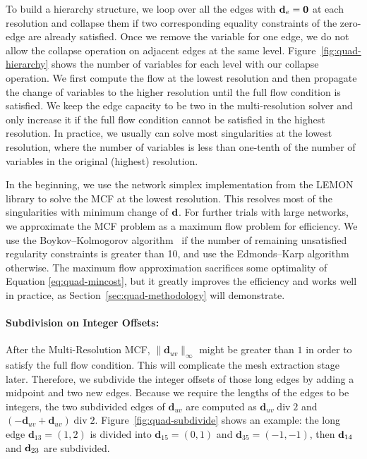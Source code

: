 To build a hierarchy structure, we loop over all the edges with ${\mathbf{d}}_e=\textbf{0}$ at each resolution and collapse them if two corresponding equality constraints of the zero-edge are already satisfied. Once we remove the variable for one edge, we do not allow the collapse operation on adjacent edges at the same level. Figure~\ref{fig:quad-hierarchy} shows the number of variables for each level with our collapse operation. We first compute the flow at the lowest resolution and then propagate the change of variables to the higher resolution until the full flow condition is satisfied.  We keep the edge capacity to be two in the multi-resolution solver and only increase it if the full flow condition cannot be satisfied in the highest resolution. In practice, we usually can solve most singularities at the lowest resolution, where the number of variables is less than one-tenth of the number of variables in the original (highest) resolution.  

In the beginning, we use the network simplex implementation from the LEMON library \cite{dezsHo2011lemon} to solve the MCF at the lowest resolution.  This resolves most of the singularities with minimum change of ${\mathbf{d}}$.  For further trials with large networks, we approximate the MCF problem as a maximum flow problem for efficiency.  We use the Boykov--Kolmogorov algorithm~\cite{boykov2004experimental} if the number of remaining unsatisfied regularity constraints is greater than 10, and use the Edmonds--Karp algorithm~\cite{edmonds1972theoretical} otherwise.  The maximum flow approximation sacrifices some optimality of Equation \eqref{eq:quad-mincost}, but it greatly improves the efficiency and works well in practice, as Section~\ref{sec:quad-methodology} will demonstrate.

\paragraph*{Subdivision on Integer Offsets:}
After the Multi-Resolution MCF, $\|{\textbf{d}}_{uv}\|_{\infty}$ might be greater than $1$ in order to satisfy the full flow condition.  This will complicate the mesh extraction stage later. Therefore, we subdivide the integer offsets of those long edges by adding a midpoint and two new edges. Because we require the lengths of the edges to be integers, the two subdivided edges of ${\textbf{d}}_{uv}$ are computed as ${\textbf{d}}_{uv}\;\text{div}\;2$ and $(-{\textbf{d}}_{uv}+{\textbf{d}}_{uv})\;\text{div}\;2$. Figure~\ref{fig:quad-subdivide} shows an example: the long edge ${\textbf{d}}_{13}=(1,2)$ is divided into ${\textbf{d}}_{15}=(0,1)$ and ${\textbf{d}}_{35}=(-1,-1)$, then ${\mathbf{d}}_{14}$ and ${\mathbf{d}}_{23}$ are subdivided.

